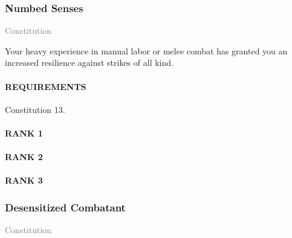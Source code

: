 

\subsubsection{Numbed Senses} \label{feat::numbedsenses}
\small{\textcolor{gray}{Constitution}}

\normalsize
Your heavy experience in manual labor or melee combat has granted you an increased resilience against strikes of all kind.
\paragraph{REQUIREMENTS} Constitution 13.
\paragraph{RANK 1}
\paragraph{RANK 2}
\paragraph{RANK 3}

\subsubsection{Desensitized Combatant} \label{feat::desensitizedcombatant}
\small{\textcolor{gray}{Constitution}}

